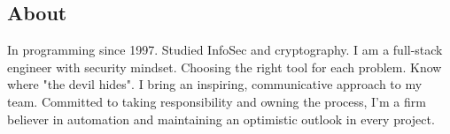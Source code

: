 \documentclass[letterpaper, 11pt]{article}
\begin{document}

\subsection*{About}

In programming since 1997. Studied InfoSec and cryptography. I am a full-stack engineer with security mindset.
Choosing the right tool for each problem. Know where "the devil hides". I bring an inspiring, communicative approach to my team.
Committed to taking responsibility and owning the process, I'm a firm believer in automation and maintaining an optimistic outlook in every project.









% 

% 




\end{document}
